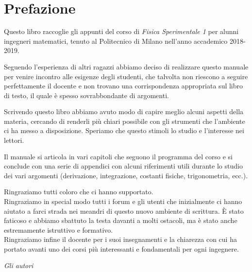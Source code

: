 \section*{Prefazione}

Questo libro raccoglie gli appunti del corso di \emph{Fisica Sperimentale 1} per alunni ingegneri matematici, tenuto al Politecnico di Milano nell'anno accademico 2018-2019.%

Seguendo l'esperienza di altri ragazzi abbiamo deciso di realizzare questo manuale per venire incontro alle esigenze degli studenti, che talvolta non riescono a seguire perfettamente il docente e non trovano una corrispondenza appropriata sul libro di testo, il quale è spesso sovrabbondante di argomenti.

Scrivendo questo libro abbiamo avuto modo di capire meglio alcuni aspetti della materia, cercando di renderli più chiari possibile con gli strumenti che l'ambiente \latex ci ha messo a disposizione. Speriamo che questo stimoli lo studio e l'interesse nei lettori.

Il manuale si articola in vari capitoli che seguono il programma del corso e si conclude con una serie di appendici con alcuni riferimenti utili durante lo studio dei vari argomenti (derivazione, integrazione, costanti fisiche, trigonometria, ecc.).

Ringraziamo tutti coloro che ci hanno supportato.\\
Ringraziamo in special modo tutti i forum e gli utenti che inizialmente ci hanno aiutato a farci strada nei meandri di questo nuovo ambiente di scrittura. È stato faticoso e abbiamo sbattuto la testa davanti a molti ostacoli, ma è stato anche estremamente istruttivo e formativo.\\
Ringraziamo infine il docente per i suoi insegnamenti e la chiarezza con cui ha portato avanti uno dei corsi più interessanti e fondamentali per ogni ingegnere.

\begin{flushright}
	\emph{Gli autori} \hspace*{2cm}
\end{flushright}